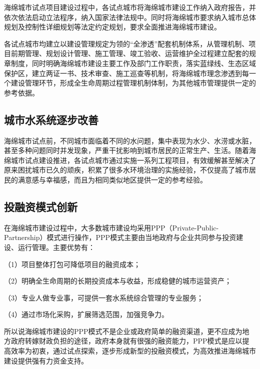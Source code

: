 \documentclass[]{book}
\begin{document}
海绵城市试点项目建设过程中，各试点城市将海绵城市建设工作纳入政府报告，并依次依法启动立法程序，纳入国家法律法规中。同时将海绵城市要求纳入城市总体规划及控制性详细规划等法定约定规划，要求全面推进海绵城市建设。

各试点城市均建立以建设管理规定为领的``全渗透''配套机制体系，从管理机制、项目前期管理、规划设计管理、施工管理、竣工验收、运营维护全过程建立配套的规章制度，同时明确海绵城市建设主要工作及部门工作职责，落实蓝绿线、生态区域保护区，建立两证一书、技术审查、施工巡查等机制，将海绵城市理念渗透到每一个建设管理环节，形成全生命周期过程管理机制体制，为其他城市管理提供一定的参考依据。

\hypertarget{ux57ceux5e02ux6c34ux7cfbux7edfux9010ux6b65ux6539ux5584}{%
\subsection{城市水系统逐步改善}\label{ux57ceux5e02ux6c34ux7cfbux7edfux9010ux6b65ux6539ux5584}}

海绵城市试点前，不同城市面临着不同的水问题，集中表现为水少、水涝或水脏，甚至多种问题同时并发现象，严重干扰影响到城市居民的正常生产、生活。随着海绵城市试点建设推进，各试点城市通过实施一系列工程项目，有效缓解甚至解决了原来困扰城市已久的顽疾，积累了很多水环境治理的实施经验，不仅提高了城市居民的满意感与幸福感，而且为相同类似地区提供一定的参考经验。

\hypertarget{ux6295ux878dux8d44ux6a21ux5f0fux521bux65b0}{%
\subsection{投融资模式创新}\label{ux6295ux878dux8d44ux6a21ux5f0fux521bux65b0}}

在海绵城市建设过程中，大多数城市建设均采用PPP（Private-Public-Partnership）模式进行操作，PPP模式主要由当地政府与企业共同参与投资建设、运行管理。主要优势有：

（1）项目整体打包可降低项目的融资成本；

（2）明确全生命周期的长期投资成本与收益，形成稳健的城市运营资产；

（3）专业人做专业事，可提供一套水系统综合管理的专业服务；

（4）通过市场化采购，扩展筛选范围，加强竞争力。

所以说海绵城市建设的PPP模式不是企业或政府简单的融资渠道，更不应成为地方政府转嫁财政负担的途径，政府本身就有很强的融资能力，PPP模式是应以提高效率为初衷，通过试点探索，逐步形成新型的投融资模式，为高效推进海绵城市建设提供强有力资金支持。
\end{document}
